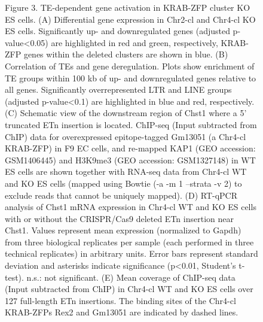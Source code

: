 \documentclass[11pt,a4paper]{article}
\begin{document}
\begin{figure}[h]
\caption{Figure 3. TE-dependent gene activation in KRAB-ZFP cluster KO ES cells. (A) Differential gene expression in Chr2-cl and Chr4-cl KO ES cells. Significantly up- and downregulated genes (adjusted p-value<0.05) are highlighted in red and green, respectively, KRAB-ZFP genes within the deleted clusters are shown in blue. (B) Correlation of TEs and gene deregulation. Plots show enrichment of TE groups within 100 kb of up- and downregulated genes relative to all genes. Significantly overrepresented LTR and LINE groups (adjusted p-value<0.1) are highlighted in blue and red, respectively. (C) Schematic view of the downstream region of Chst1 where a 5’ truncated ETn insertion is located. ChIP-seq (Input subtracted from ChIP) data for overexpressed epitope-tagged Gm13051 (a Chr4-cl KRAB-ZFP) in F9 EC cells, and re-mapped KAP1 (GEO accession: GSM1406445) and H3K9me3 (GEO accession: GSM1327148) in WT ES cells are shown together with RNA-seq data from Chr4-cl WT and KO ES cells (mapped using Bowtie (-a -m 1 --strata -v 2) to exclude reads that cannot be uniquely mapped). (D) RT-qPCR analysis of Chst1 mRNA expression in Chr4-cl WT and KO ES cells with or without the CRISPR/Cas9 deleted ETn insertion near Chst1. Values represent mean expression (normalized to Gapdh) from three biological replicates per sample (each performed in three technical replicates) in arbitrary units. Error bars represent standard deviation and asterisks indicate significance (p<0.01, Student’s t-test). n.s.: not significant. (E) Mean coverage of ChIP-seq data (Input subtracted from ChIP) in Chr4-cl WT and KO ES cells over 127 full-length ETn insertions. The binding sites of the Chr4-cl KRAB-ZFPs Rex2 and Gm13051 are indicated by dashed lines.}
\end{figure}
\end{document}
